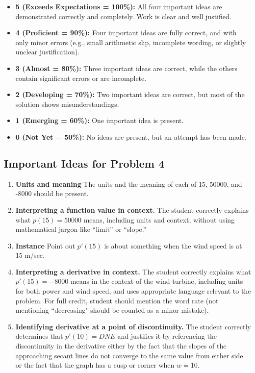 \documentclass[11pt]{article}
\begin{document}
\begin{itemize}
    \item \textbf{5 (Exceeds Expectations = 100\%):}  
    All four important ideas are demonstrated correctly and completely. Work is clear and well justified.

    \item \textbf{4 (Proficient = 90\%):}  
    Four important ideas are fully correct, and with only minor errors (e.g., small arithmetic slip, incomplete wording, or slightly unclear justification).

    \item \textbf{3 (Almost = 80\%):}  
    Three important ideas are correct, while the others contain significant errors or are incomplete.

    \item \textbf{2 (Developing = 70\%):}  
    Two important ideas are  correct, but most of the solution shows misunderstandings.

    \item \textbf{1 (Emerging = 60\%):}  
    One important idea is present.

    \item \textbf{0 (Not Yet = 50\%):}  
    No ideas are present, but an attempt has been made.
\end{itemize}
\newpage
\subsection*{Important Ideas for Problem 4}
\begin{enumerate}
    \item \textbf{Units and meaning} The units and the meaning of each of 15, 50000, and -8000 should be present.

    \item \textbf{Interpreting a function value in context.}  
    The student correctly explains what $p(15)=50000$ means, including units and context, without using mathematical jargon like “limit” or “slope.”

    \item \textbf{Instance} Point out $p'(15)$ is about something when the wind speed is at 15 m/sec.


    \item \textbf{Interpreting a derivative in context.}  
    The student correctly explains what $p'(15)=-8000$ means in the context of the wind turbine, including units for both power and wind speed, and uses appropriate language relevant to the problem. For full credit, student should mention the word rate (not mentioning ``decreasing" should be counted as a minor mistake).

    \item \textbf{Identifying derivative at a point of discontinuity.}  
    The student correctly determines that $p'(10)=DNE$ and justifies it by referencing the discontinuity in the derivative either by the fact that the slopes of the approaching secant lines do not converge to the same value from either side or the fact that the graph has a cusp or corner when $w = 10$.
\end{enumerate}
\end{document}
